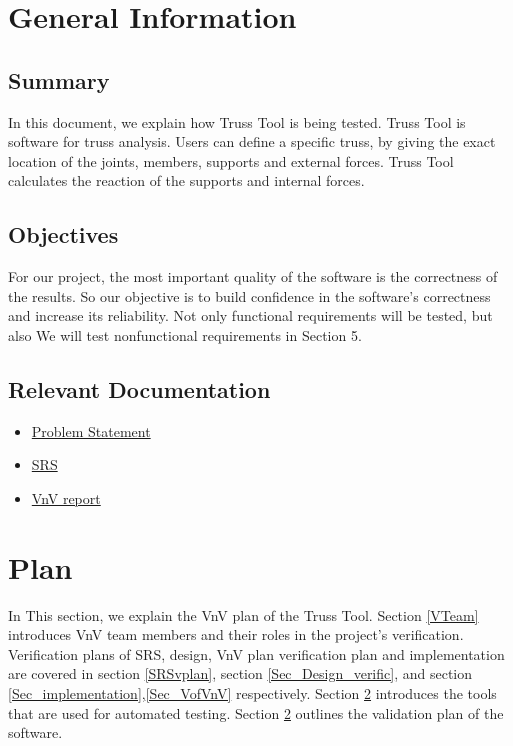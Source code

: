 \documentclass[12pt, titlepage]{article}
\begin{document}
\section{General Information}


\subsection{Summary}

In this document, we explain how Truss Tool is being tested. Truss Tool is software for truss analysis. Users can define a specific truss, by giving the exact location of the joints, members, supports and external forces.  Truss Tool calculates the reaction of the supports and internal forces. 

\subsection{Objectives}

For our project, the most important quality of the software is the correctness of the results. So our objective is to build confidence in the software's correctness and increase its reliability. Not only functional requirements will be tested, but also We will test nonfunctional requirements in Section 5. 

\subsection{Relevant Documentation}
\begin{itemize}
	\item 
	\href{https://github.com/Maryamvalian/project741/blob/main/docs/ProblemStatementAndGoals/ProblemStatement.pdf}{Problem
	 Statement}
	\item 
	\href{https://github.com/Maryamvalian/project741/blob/main/docs/SRS/SRS.pdf}{SRS} 
	\item \href{https://github.com/Maryamvalian/project741/blob/main/docs/VnVReport/VnVReport.pdf}{VnV
	 report}
\end{itemize}

\section{Plan}
In This section, we explain the VnV plan of the Truss Tool. Section \ref{VTeam} introduces VnV team members and their roles in the project's verification. Verification plans of SRS, design, VnV plan verification plan and implementation are covered in section \ref{SRSvplan}, section \ref{Sec_Design_verific}, and section \ref{Sec_implementation},\ref{Sec_VofVnV} respectively. Section \ref{} introduces the tools that are used for automated testing. Section \ref{} outlines the validation plan of the software.
\end{document}
